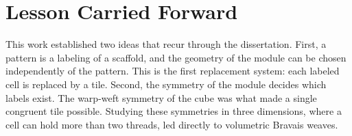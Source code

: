 \section{Lesson Carried Forward}

This work established two ideas that recur through the dissertation. First, a pattern is a labeling of a scaffold, and the geometry of the module can be chosen independently of the pattern. This is the first replacement system: each labeled cell is replaced by a tile. Second, the symmetry of the module decides which labels exist. The warp-weft symmetry of the cube was what made a single congruent tile possible. Studying these symmetries in three dimensions, where a cell can hold more than two threads, led directly to volumetric Bravais weaves.
